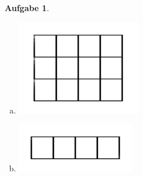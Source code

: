 \documentclass{article}
\newtheorem{aufgabe}{Aufgabe}[section]
\begin{document}
\begin{aufgabe}
\begin{paracol}{2}
\begin{enumerate}[(a)]
\item
\begin{minipage}{\linewidth}
\vspace{10mm}
\centering
\includegraphics[width=0.7\linewidth]{pictures/quadrate3x4.png}
\vspace{10mm}
\end{minipage}

\item
\begin{minipage}{\linewidth}
\vspace{20mm}
\centering
\includegraphics[width=0.7\linewidth]{pictures/quadrate3x4-1x4.png}
\vspace{20mm}
\end{minipage}
\end{enumerate}

\end{paracol}
\end{aufgabe}
\end{document}
